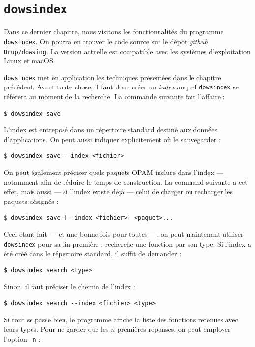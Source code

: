 \documentclass[a4paper]{report}
\theoremstyle{definition}
\newcommand{\dowsindex}{\texttt{dowsindex}\xspace}
\begin{document}
\chapter{\dowsindex}

Dans ce dernier chapitre, nous visitons les fonctionnalités du programme \dowsindex. On pourra en trouver le code source sur le dépôt \textit{github} \texttt{Drup/dowsing}. La version actuelle est compatible avec les systèmes d'exploitation Linux et macOS.

\dowsindex met en application les techniques présentées dans le chapitre précédent. Avant toute chose, il faut donc créer un \emph{index} auquel \dowsindex se référera au moment de la recherche. La commande suivante fait l'affaire :

\begin{verbatim}
$ dowsindex save
\end{verbatim}

L'index est entreposé dans un répertoire standard destiné aux données d'applications. On peut aussi indiquer explicitement où le sauvegarder :

\begin{verbatim}
$ dowsindex save --index <fichier>
\end{verbatim}

On peut également préciser quels paquets OPAM inclure dans l'index — notamment afin de réduire le temps de construction. La command suivante a cet effet, mais aussi — si l'index existe déjà — celui de charger ou recharger les paquets désignés :

\begin{verbatim}
$ dowsindex save [--index <fichier>] <paquet>...
\end{verbatim}

Ceci étant fait — et une bonne fois pour toutes —, on peut maintenant utiliser \dowsindex pour sa fin première : recherche une fonction par son type. Si l'index a été créé dans le répertoire standard, il suffit de demander :

\begin{verbatim}
$ dowsindex search <type>
\end{verbatim}

Sinon, il faut préciser le chemin de l'index :

\begin{verbatim}
$ dowsindex search --index <fichier> <type>
\end{verbatim}

Si tout se passe bien, le programme affiche la liste des fonctions retenues avec leurs types. Pour ne garder que les $n$ premières réponses, on peut employer l'option \texttt{-n} :
\end{document}
